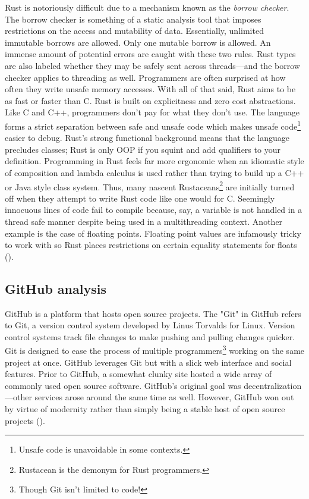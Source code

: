 \documentclass[12pt, a4paper]{article}
\begin{document}
Rust is notoriously difficult due to a mechanism known as the \textit{borrow checker}. The borrow checker is something of a static analysis tool that imposes restrictions on the access and mutability of data. Essentially, unlimited immutable borrows are allowed. Only one mutable borrow is allowed. An immense amount of potential errors are caught with these two rules. Rust types are also labeled whether they may be safely sent across threads---and the borrow checker applies to threading as well. Programmers are often surprised at how often they write unsafe memory accesses. With all of that said, Rust aims to be as fast or faster than C. Rust is built on explicitness and zero cost abstractions. Like C and C++, programmers don't pay for what they don't use. The language forms a strict separation between safe and unsafe code which makes unsafe code\footnote{Unsafe code is unavoidable in some contexts.} easier to debug. Rust's strong functional background means that the language precludes classes; Rust is only OOP if you squint and add qualifiers to your definition. Programming in Rust feels far more ergonomic when an idiomatic style of composition and lambda calculus is used rather than trying to build up a C++ or Java style class system. Thus, many nascent Rustaceans\footnote{Rustacean is the demonym for Rust programmers.} are initially turned off when they attempt to write Rust code like one would for C. Seemingly innocuous lines of code fail to compile because, say, a variable is not handled in a thread safe manner despite being used in a multithreading context. Another example is the case of floating points. Floating point values are infamously tricky to work with so Rust places restrictions on certain equality statements for floats (\cite{programmingrust}).

\subsection{GitHub analysis}
GitHub is a platform that hosts open source projects. The "Git" in GitHub refers to Git, a version control system developed by Linus Torvalds for Linux. Version control systems track file changes to make pushing and pulling changes quicker. Git is designed to ease the process of multiple programmers\footnote{Though Git isn't limited to code!} working on the same project at once. GitHub leverages Git but with a slick web interface and social features. Prior to GitHub, a somewhat clunky site hosted a wide array of commonly used open source software. GitHub's original goal was decentralization---other services arose around the same time as well. However, GitHub won out by virtue of modernity rather than simply being a stable host of open source projects (\cite{metz2015}).
\end{document}
